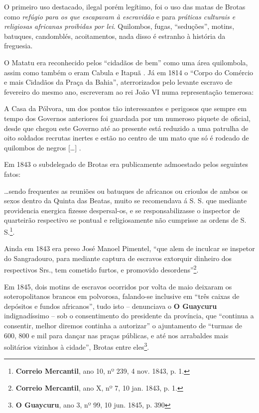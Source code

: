 O primeiro uso destacado, ilegal porém legítimo, foi o uso das matas de Brotas como \textit{refúgio para os que escapavam à escravidão} e para \textit{práticas culturais e religiosas africanas proibidas por lei}. Quilombos, fugas, ``seduções'', motins, batuques, candomblés, acoitamentos, nada disso é estranho à história da freguesia.

O Matatu era reconhecido pelos ``cidadãos de bem'' como uma área quilombola, assim como também o eram Cabula e Itapuã \cite[p.~377]{schwartz_1814_1996}. Já em 1814 o ``Corpo do Comércio e mais Cidadãos da Praça da Bahia'', aterrorizados pelo levante escravo de fevereiro do mesmo ano, escreveram ao rei João VI numa representação temerosa:

\begin{citacao}
A Casa da Pólvora, um dos pontos tão interessantes e perigosos que sempre em tempo dos Governos anteriores foi guardada por um numeroso piquete de oficial, desde que chegou este Governo até ao presente está reduzido a uma patrulha de oito soldados recrutas inertes e estão no centro de um mato que só é rodeado de quilombos de negros [\dots] \cite[pp.~103-106]{ott_formaet2_1957}.
\end{citacao}

Em 1843 o subdelegado de Brotas era publicamente admoestado pelos seguintes fatos:

\begin{citacao}
\dots sendo frequentes as reuniões ou batuques de africanos ou crioulos de ambos os sexos dentro da Quinta das Beatas, muito se recomendava á S. S. que mediante providencia energica fizesse despersal-os, e se responsabilizasse o inspector de quarteirão respectivo se pontual e religiosamente não cumprisse as ordens de S. S.\footnote{\textbf{Correio Mercantil}, ano 10, nº 239, 4 nov. 1843, p. 1.}.
\end{citacao}

Ainda em 1843 era preso José Manoel Pimentel, ``que alem de inculcar se inspetor do Sangradouro, para mediante captura de escravos extorquir dinheiro dos respectivos Srs., tem cometido furtos, e promovido desordens''\footnote{\textbf{Correio Mercantil}, ano X, nº 7, 10 jan. 1843, p. 1.}.

Em 1845, dois motins de escravos ocorridos por volta de maio deixaram os soteropolitanos brancos em polvorosa, falando-se inclusive em ``três caixas de depósitos e fundos africanos'', tudo isto -- denunciava o \textbf{O Guaycuru} indignadíssimo -- sob o consentimento do presidente da província, que ``continua a consentir, melhor diremos continha a autorizar'' o ajuntamento de ``turmas de  600, 800 e mil para dançar nas praças públicas, e até nos arrabaldes mais solitários vizinhos à cidade'', Brotas entre eles\footnote{\textbf{O Guaycuru}, ano 3, nº 99, 10 jun. 1845, p. 390}.


